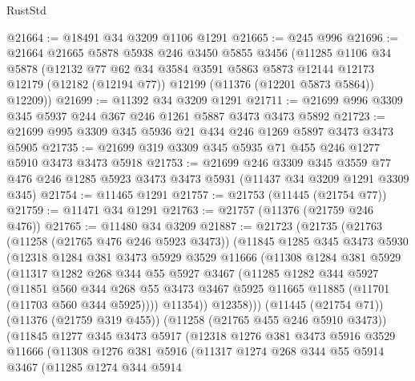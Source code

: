 \begin{lexlean}{RustStd}
\begin{coremodule}
{{{{{{{{{{{{{{{{{{{@21664 := @18491 @34 @3209 @1106 @1291
@21665 := @245 @996
@21696 := @21664
    @21665
    @5878
    @5938
    @246
    @3450
    @5855
    @3456
    (@11285
      @1106
      @34
      @5878
      (@12132
        @77
        @62
        @34
        @3584
        @3591
        @5863
        @5873
        @12144
        @12173
        @12179
        (@12182 (@12194 @77))
        @12199
        (@11376 (@12201 @5873 @5864))
        @12209))
@21699 := @11392 @34 @3209 @1291
@21711 := @21699 @996 @3309 @345 @5937 @244 @367 @246 @1261 @5887 @3473 @3473 @5892
@21723 := @21699 @995 @3309 @345 @5936 @21 @434 @246 @1269 @5897 @3473 @3473 @5905
@21735 := @21699 @319 @3309 @345 @5935 @71 @455 @246 @1277 @5910 @3473 @3473 @5918
@21753 := @21699
    @246
    @3309
    @345
    @3559
    @77
    @476
    @246
    @1285
    @5923
    @3473
    @3473
    @5931
    (@11437 @34 @3209 @1291 @3309 @345)
@21754 := @11465 @1291
@21757 := @21753 (@11445 (@21754 @77))
@21759 := @11471 @34 @1291
@21763 := @21757 (@11376 (@21759 @246 @476))
@21765 := @11480 @34 @3209
@21887 := @21723
    (@21735
      (@21763
        (@11258 (@21765 @476 @246 @5923 @3473))
        (@11845
          @1285
          @345
          @3473
          @5930
          (@12318
            @1284
            @381
            @3473
            @5929
            @3529
            @11666
            (@11308
              @1284
              @381
              @5929
              (@11317
                @1282
                @268
                @344
                @55
                @5927
                @3467
                (@11285
                  @1282
                  @344
                  @5927
                  (@11851
                    @560
                    @344
                    @268
                    @55
                    @3473
                    @3467
                    @5925
                    @11665
                    @11885
                    (@11701 (@11703 @560 @344 @5925))))
                @11354))
            @12358)))
      (@11445 (@21754 @71))
      (@11376 (@21759 @319 @455))
      (@11258 (@21765 @455 @246 @5910 @3473))
      (@11845
        @1277
        @345
        @3473
        @5917
        (@12318
          @1276
          @381
          @3473
          @5916
          @3529
          @11666
          (@11308
            @1276
            @381
            @5916
            (@11317
              @1274
              @268
              @344
              @55
              @5914
              @3467
              (@11285
                @1274
                @344
                @5914
}}}}}}}}}}}}}}}}}}}
\end{coremodule}
\end{lexlean}
